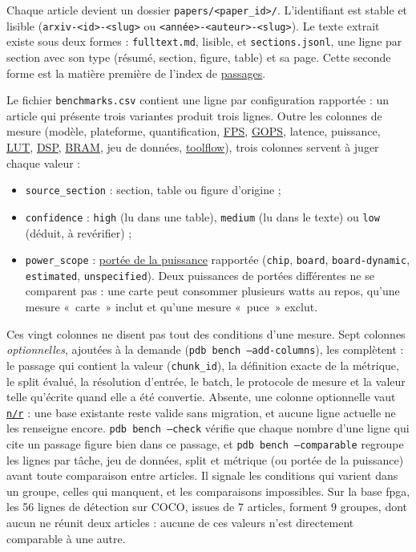 \documentclass[11pt,a4paper]{article}
\newcommand{\cmd}[1]{\texttt{#1}}
\newcommand{\gl}[2]{\hyperlink{gl:#1}{\textcolor{glcolor}{#2}}}
\newcommand{\nr}{\gl{nr}{\texttt{n/r}}}
\begin{document}
Chaque article devient un dossier \cmd{papers/<paper\_id>/}. L'identifiant est stable et
lisible (\cmd{arxiv-<id>-<slug>} ou \cmd{<année>-<auteur>-<slug>}). Le texte extrait existe
sous deux formes : \cmd{fulltext.md}, lisible, et \cmd{sections.jsonl}, une ligne par
section avec son type (résumé, section, figure, table) et sa page. Cette seconde forme est
la matière première de l'index de \gl{passage}{passages}.

Le fichier \cmd{benchmarks.csv} contient une ligne par configuration rapportée : un article
qui présente trois variantes produit trois lignes. Outre les colonnes de mesure (modèle,
plateforme, quantification, \gl{FPS}{FPS}, \gl{GOPS}{GOPS}, latence, puissance, \gl{LUT}{LUT}, \gl{DSP}{DSP}, \gl{BRAM}{BRAM}, jeu de données,
\gl{toolflow}{toolflow}), trois colonnes servent à juger chaque valeur :
\begin{itemize}
  \item \cmd{source\_section} : section, table ou figure d'origine ;
  \item \cmd{confidence} : \cmd{high} (lu dans une table), \cmd{medium} (lu dans le texte)
    ou \cmd{low} (déduit, à revérifier) ;
  \item \cmd{power\_scope} : \gl{scope}{portée de la puissance} rapportée (\cmd{chip}, \cmd{board},
    \cmd{board-dynamic}, \cmd{estimated}, \cmd{unspecified}). Deux puissances de portées
    différentes ne se comparent pas : une carte peut consommer plusieurs watts au repos,
    qu'une mesure «~carte~» inclut et qu'une mesure «~puce~» exclut.
\end{itemize}
Ces vingt colonnes ne disent pas tout des conditions d'une mesure. Sept colonnes
\emph{optionnelles}, ajoutées à la demande (\cmd{pdb bench --add-columns}), les complètent :
le passage qui contient la valeur (\cmd{chunk\_id}), la définition exacte de la métrique, le
split évalué, la résolution d'entrée, le batch, le protocole de mesure et la valeur telle
qu'écrite quand elle a été convertie. Absente, une colonne optionnelle vaut \nr{} : une base
existante reste valide sans migration, et aucune ligne actuelle ne les renseigne encore.
\cmd{pdb bench --check} vérifie que chaque nombre d'une ligne qui cite un passage figure bien
dans ce passage, et \cmd{pdb bench --comparable} regroupe les lignes par tâche, jeu de
données, split et métrique (ou portée de la puissance) avant toute comparaison entre
articles. Il signale les conditions qui varient dans un groupe, celles qui manquent, et les
comparaisons impossibles. Sur la base fpga, les 56 lignes de détection sur COCO, issues de
7 articles, forment 9 groupes, dont aucun ne réunit deux articles : aucune de ces valeurs
n'est directement comparable à une autre.
\end{document}
